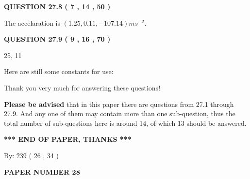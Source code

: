 \documentclass[12pt]{article}
\begin{document}
{\textbf{\Large{QUESTION
27.8 
 (           7 ,          14 ,          50 )
}}}
  
  
 
 
\noindent{}
 
 
  The accelaration is $  %
(
1.25,
0.11,
-107.14)
ms^{-2} $.
 
 
 
 
  
\vspace{0.2in}
  
{\textbf{\Large{QUESTION
27.9 
 (           9 ,          16 ,          70 )
}}}
  
  


 
 
\noindent{}

25,  %
11
 
 
 
   
   
 \vspace{0.2in}
Here are still some constants for use:
 
 
 
 
Thank you very much for answering these questions!
 
{\textbf{\large{Please be advised}}} that in this paper there are questions from
27.1 through
27.9.
And any one of them may contain more than one sub-question, thus the total number
of sub-questions here is around 14, of which
13 should be answered.
 
   
   
   
   
\vspace{1.0in} 
{\textbf{\large{ *** END OF PAPER, THANKS *** }}} 
   
   
\hspace{1.0in} By: 
         239 (          26 ,           34 )
   
   
   
   
\newpage 
\setcounter{page}{ 
    28001 } 
   
   
   
   
 {\textbf{ \Large{ PAPER NUMBER           28  }}}
   
   
\vspace{0.2in}
   
   
   
\end{document}
